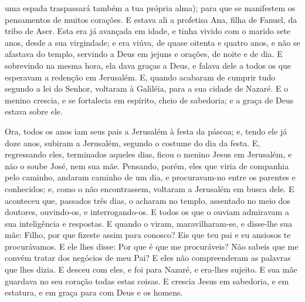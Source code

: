 uma espada traspassará também a tua própria alma); para que se
manifestem os pensamentos de muitos corações. E estava ali a
profetisa Ana, filha de Fanuel, da tribo de Aser. Esta era já
avançada em idade, e tinha vivido com o marido sete anos, desde a
sua virgindade; e era viúva, de quase oitenta e quatro anos,
e não se afastava do templo, servindo a Deus em jejuns e orações, de
noite e de dia. E sobrevindo na mesma hora, ela dava graças a
Deus, e falava dele a todos os que esperavam a redenção em
Jerusalém. E, quando acabaram de cumprir tudo segundo a lei
do Senhor, voltaram à Galiléia, para a sua cidade de Nazaré.
E o menino crescia, e se fortalecia em espírito, cheio de
sabedoria; e a graça de Deus estava sobre ele.

Ora, todos os anos iam seus pais a Jerusalém à festa da páscoa;
e, tendo ele já doze anos, subiram a Jerusalém, segundo o
costume do dia da festa. E, regressando eles, terminados
aqueles dias, ficou o menino Jesus em Jerusalém, e não o soube José,
nem sua mãe. Pensando, porém, eles que viria de companhia
pelo caminho, andaram caminho de um dia, e procuravam-no entre os
parentes e conhecidos; e, como o não encontrassem, voltaram a
Jerusalém em busca dele. E aconteceu que, passados três dias,
o acharam no templo, assentado no meio dos doutores, ouvindo-os, e
interrogando-os. E todos os que o ouviam admiravam a sua
inteligência e respostas. E quando o viram, maravilharam-se,
e disse-lhe sua mãe: Filho, por que fizeste assim para conosco? Eis
que teu pai e eu ansiosos te procurávamos. E ele lhes disse:
Por que é que me procuráveis? Não sabeis que me convém tratar dos
negócios de meu Pai? E eles não compreenderam as palavras que
lhes dizia. E desceu com eles, e foi para Nazaré, e era-lhes
sujeito. E sua mãe guardava no seu coração todas estas coisas.
E crescia Jesus em sabedoria, e em estatura, e em graça para
com Deus e os homens.

\medskip

